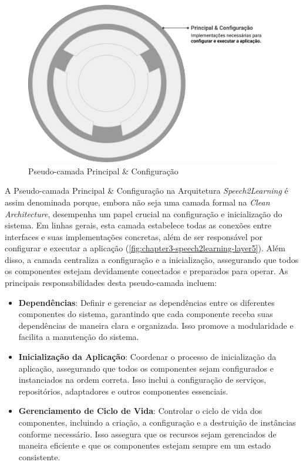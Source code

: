 \begin{figure}[htb]
\centering
\caption{Pseudo-camada Principal \& Configuração}
\label{fig:chapter3-speech2learning-layer5}
\includegraphics[width=1\textwidth]{images/chapter3-speech2learning-layer5.png}
\end{figure}

A Pseudo-camada Principal \& Configuração na Arquitetura \textit{Speech2Learning} é assim denominada porque, embora não seja uma camada formal na \textit{Clean Architecture}, desempenha um papel crucial na configuração e inicialização do sistema. Em linhas gerais, esta camada estabelece todas as conexões entre interfaces e suas implementações concretas, além de ser responsável por configurar e executar a aplicação (\autoref{fig:chapter3-speech2learning-layer5}). Além disso, a camada centraliza a configuração e a inicialização, assegurando que todos os componentes estejam devidamente conectados e preparados para operar. As principais responsabilidades desta pseudo-camada incluem:

\begin{itemize}
    \item \textbf{Dependências}: Definir e gerenciar as dependências entre os diferentes componentes do sistema, garantindo que cada componente receba suas dependências de maneira clara e organizada. Isso promove a modularidade e facilita a manutenção do sistema.

    \item \textbf{Inicialização da Aplicação}: Coordenar o processo de inicialização da aplicação, assegurando que todos os componentes sejam configurados e instanciados na ordem correta. Isso inclui a configuração de serviços, repositórios, adaptadores e outros componentes essenciais.

    \item \textbf{Gerenciamento de Ciclo de Vida}: Controlar o ciclo de vida dos componentes, incluindo a criação, a configuração e a destruição de instâncias conforme necessário. Isso assegura que os recursos sejam gerenciados de maneira eficiente e que os componentes estejam sempre em um estado consistente.
\end{itemize}

